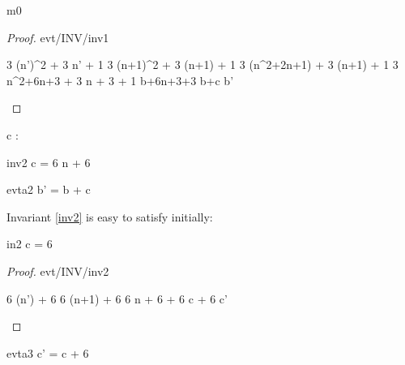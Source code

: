 \documentclass[12pt]{amsart}
\begin{document}
\begin{machine}{m0}
\begin{proof}{evt/INV/inv1}
	\begin{calculation}
		3 \cdot (n')^2 + 3 \cdot n' + 1
	\hint{=}{ \ref{a0} }
		3 \cdot (n+1)^2 + 3 \cdot (n+1) + 1
		3 \cdot (n^2+2\cdot n+1) + 3 \cdot (n+1) + 1
		3 \cdot n^2+6\cdot n+3 + 3 \cdot n + 3 + 1
	\hint{=}{ \ref{inv1} }
		b+6\cdot n+3+3
		b+c
		b'
	\end{calculation}
\end{proof}

\begin{variable}
	c : \Int
\end{variable}

\begin{invariant}{inv2}
	c = 6 \cdot n + 6
\end{invariant}

\begin{evassignment}{evt}{a2}
	b' = b + c
\end{evassignment}

Invariant \ref{inv2} is easy to satisfy initially:

\begin{initialization}{in2}
	c = 6
\end{initialization}

\begin{proof}{evt/INV/inv2}
	\begin{calculation}
		6 \cdot (n') + 6
	\hint{=}{ \ref{a0} }
		6 \cdot (n+1) + 6
	\hint{=}{ arithmetic }
		6 \cdot n + 6 + 6
	\hint{=}{ \ref{inv2} }
		c + 6
	\hint{=}{ \ref{a3} }
		c'
	\end{calculation}
\end{proof}
%
\begin{evassignment}{evt}{a3}
	c' = c + 6
\end{evassignment}

\end{machine}
\end{document}
